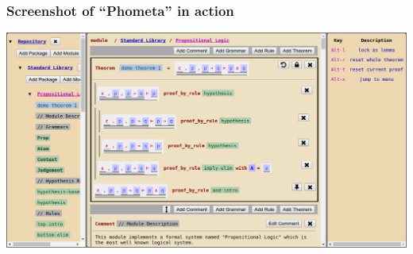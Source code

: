 \documentclass[notes]{beamer}
\begin{document}
\begin{frame}
\frametitle{Screenshot of  ``Phometa'' in action}
\includegraphics[width=\linewidth,height=\textheight,keepaspectratio]{demo-1}
\end{frame}
\end{document}
